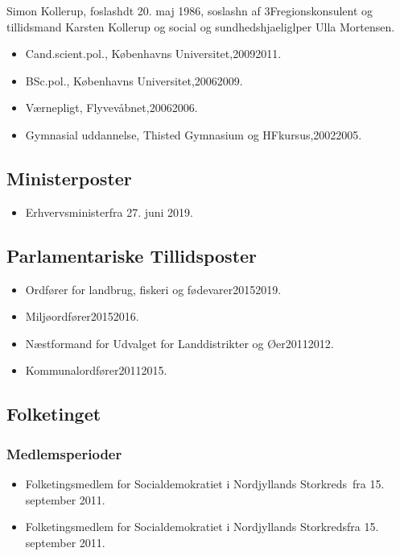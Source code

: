 \documentclass[11pt, a4paper]{awesome-cv}
\begin{document}
\makecvheader[R]
\makelettertitle
\begin{cvletter}
Simon Kollerup, foslashdt 20. maj 1986, soslashn af 3Fregionskonsulent og tillidsmand Karsten Kollerup og social og sundhedshjaeliglper Ulla Mortensen.

\begin{itemize}
\item Cand.scient.pol., Københavns Universitet,20092011.
\item BSc.pol., Københavns Universitet,20062009.
\item Værnepligt, Flyvevåbnet,20062006.
\item Gymnasial uddannelse, Thisted Gymnasium og HFkursus,20022005.
\end{itemize}
\subsection*{Ministerposter}
\begin{itemize}
\item Erhvervsministerfra 27. juni 2019.
\end{itemize}
\subsection*{Parlamentariske Tillidsposter}
\begin{itemize}
\item Ordfører for landbrug, fiskeri og fødevarer20152019.
\item Miljøordfører20152016.
\item Næstformand for Udvalget for Landdistrikter og Øer20112012.
\item Kommunalordfører20112015.
\end{itemize}
\subsection*{Folketinget}
\subsubsection*{Medlemsperioder}
\begin{itemize}
\item Folketingsmedlem for Socialdemokratiet i Nordjyllands Storkreds fra 15. september 2011.
\item Folketingsmedlem for Socialdemokratiet i Nordjyllands Storkredsfra 15. september 2011.
\end{itemize}

\end{cvletter}
\end{document}
